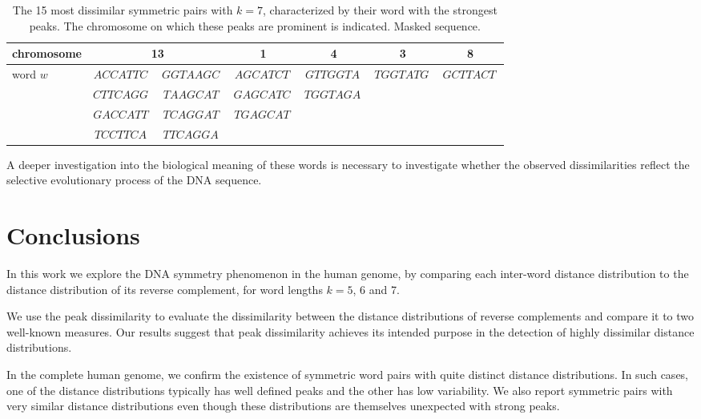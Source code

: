 \documentclass[review,12pt]{elsarticle}
\begin{document}
\begin{table}[ht]
\vspace{-0.15cm}
\centering
\caption{The 15 most dissimilar
 symmetric pairs with $k=7$, characterized
 by their word with the strongest peaks.
 The chromosome on which these peaks are
 prominent is indicated. Masked sequence.}
\renewcommand{\arraystretch}{1.2}
\setlength\tabcolsep{2.5pt}
\scriptsize
\begin{tabular}{|l|cc|c|c|c|c|}
\hline
 chromosome & \multicolumn{2}{|c|}{13} & 1
      & 4      & 3      & 8 \\
\hline
   word $w$ & $ACCATTC\:$ & $GGTAAGC\:$ &
	$AGCATCT\:$ & $GTTGGTA\:$
	& $TGGTATG\:$ & $GCTTACT\:$ \\
  & $CTTCAGG\:$ & $TAAGCAT\:$ & $GAGCATC\:$
	& $TGGTAGA\:$ & & \\
  & $GACCATT\:$ & $TCAGGAT\:$ & $TGAGCAT\:$
	&        &  & \\
	& $TCCTTCA\:$ & $TTCAGGA\:$ & & & & \\
\hline
\end{tabular}
\label{tab:bio}
\vspace{-0.15cm}
\end{table}

A deeper investigation into the biological
meaning of these words is necessary to
investigate whether the observed
dissimilarities reflect the selective
evolutionary process of the DNA sequence.

\section{Conclusions}
In this work we explore the DNA symmetry
phenomenon in the human genome, by comparing
each inter-word distance distribution to the
distance distribution of its reverse
complement, for word lengths $k=5$, 6 and 7.

We use the peak dissimilarity to evaluate
the dissimilarity between the distance
distributions of reverse complements and
compare it to two well-known measures.
Our results suggest that peak dissimilarity
achieves its intended purpose in the
detection of highly dissimilar distance
distributions.

In the complete human genome, we confirm
the existence of symmetric word pairs with
quite distinct distance distributions. In such
cases, one of the distance distributions
typically has well defined peaks and the
other has low variability. We also report
symmetric pairs with very similar distance
distributions even though these
distributions are themselves unexpected
with strong peaks.
\end{document}
